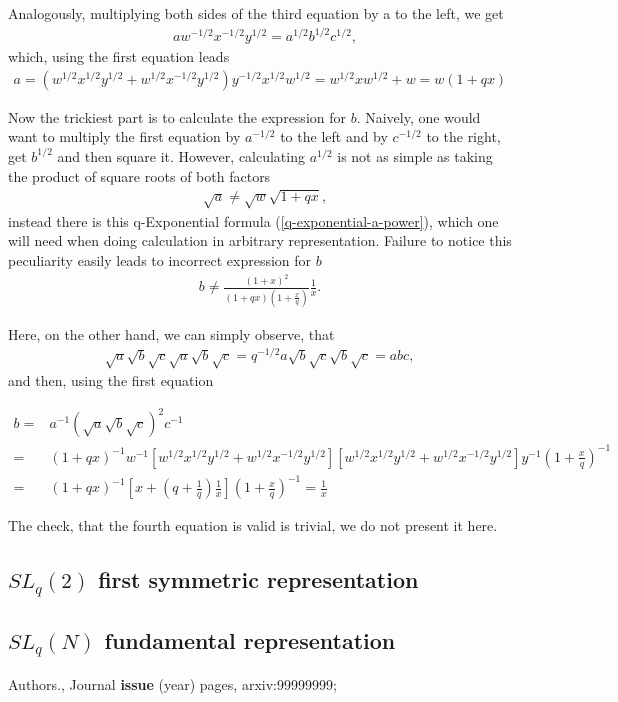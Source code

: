 \documentclass{article}
\newcommand{\lb}{\left (}
\newcommand{\rb}{\right )}
\newcommand{\lsb}{\left [}
\newcommand{\rsb}{\right ]}
\newcommand{\be}{\begin{eqnarray}}
\newcommand{\ee}{\end{eqnarray}}
\newcommand {\?}{\textit{???}}
\newcommand{\delabel}[1]{(\ref{#1})}
\begin{document}
Analogously, multiplying both sides of the third equation by a to the left, we get
\be
& a w^{-1/2} x^{-1/2} y^{1/2} = a^{1/2}b^{1/2}c^{1/2},
\ee
which, using the first equation leads
\be
a = \lb w^{1/2}x^{1/2}y^{1/2} + w^{1/2}x^{-1/2}y^{1/2} \rb y^{-1/2}x^{1/2}w^{1/2}
= w^{1/2}x w^{1/2} + w = w \lb 1 + q x \rb
\ee

Now the trickiest part is to calculate the expression for $b$. Naively, one  would want
to multiply the first equation by $a^{-1/2}$ to the left and by $c^{-1/2}$ to the right,
get $b^{1/2}$ and then square it.
However, calculating $a^{1/2}$ is not as simple as taking the product of square roots of both factors
\be
&\sqrt{a} \neq \sqrt{w} \sqrt{1 + q x},
\ee
instead there is this q-Exponential formula \delabel{q-exponential-a-power}, which one will need when
doing calculation in arbitrary representation.
Failure to notice this peculiarity easily leads to incorrect expression for $b$
\be
b \neq \frac{\lb 1 + x\rb^2}{\lb 1 + q x\rb\lb 1 + \frac{x}{q}\rb} \frac{1}{x}.
\ee

Here, on the other hand, we can simply observe, that
\be
\sqrt{a} \sqrt{b} \sqrt{c} \sqrt{a} \sqrt{b} \sqrt{c} = q^{-1/2} a \sqrt{b} \sqrt{c} \sqrt{b} \sqrt{c} = abc,
\ee
and then, using the first equation

\be
b = & a^{-1} \lb \sqrt{a}\sqrt{b}\sqrt{c} \rb^2 c^{-1} & \nonumber \\
= & \lb 1 + qx\rb^{-1}w^{-1}\lsb w^{1/2}x^{1/2}y^{1/2} + w^{1/2}x^{-1/2}y^{1/2} \rsb
\lsb w^{1/2}x^{1/2}y^{1/2} + w^{1/2}x^{-1/2}y^{1/2} \rsb y^{-1}\lb 1 + \frac{x}{q}\rb^{-1}
\\ = & \lb 1 + qx\rb^{-1} \lsb x + \lb q + \frac{1}{q} \rb \frac{1}{x} \rsb \lb 1 + \frac{x}{q}\rb^{-1} = \frac{1}{x}
\nonumber 
\ee

The check, that the fourth equation is valid is trivial, we do not present it here.

\subsection{$SL_q(2)$ first symmetric representation}
\subsection{$SL_q(N)$ fundamental representation}

\begin{thebibliography}{12}

 Authors., Journal {\bf issue} (year) pages, arxiv:99999999;

\end{thebibliography}
\end{document}

